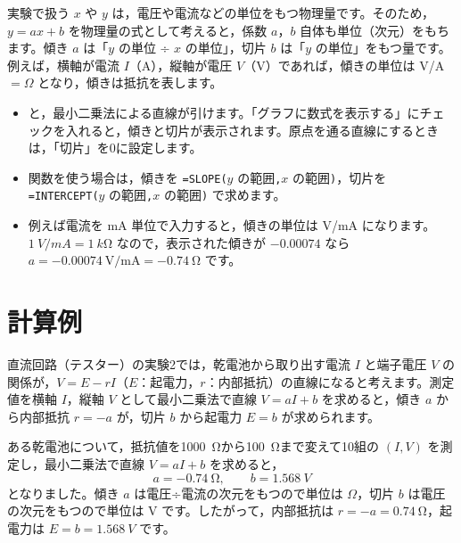 実験で扱う $x$ や $y$ は，電圧や電流などの単位をもつ物理量です。そのため，$y=ax+b$ を物理量の式として考えると，係数 $a$，$b$ 自体も単位（次元）をもちます。傾き $a$ は「$y$ の単位 ÷ $x$ の単位」，切片 $b$ は「$y$ の単位」をもつ量です。例えば，横軸が電流 $I$（A），縦軸が電圧 $V$（V）であれば，傾きの単位は V/A $=\Omega$ となり，傾きは抵抗を表します。

\begin{hosoku}
\begin{itemize}
  \item {}と，最小二乗法による直線が引けます。「グラフに数式を表示する」にチェックを入れると，傾きと切片が表示されます。原点を通る直線にするときは，「切片」を0に設定します。
  \item 関数を使う場合は，傾きを \texttt{=SLOPE(}$y$ の範囲\texttt{,}$x$ の範囲\texttt{)}，切片を \texttt{=INTERCEPT(}$y$ の範囲\texttt{,}$x$ の範囲\texttt{)} で求めます。
  \item {}例えば電流を mA 単位で入力すると，傾きの単位は V/mA になります。$\SI{1}{V/mA}=\SI{1}{k\ohm}$ なので，表示された傾きが $-0.00074$ なら $a=-0.00074\ \mathrm{V/mA}=\SI{-0.74}{\ohm}$ です。
\end{itemize}
\end{hosoku}

\section{計算例}

直流回路（テスター）の実験2では，乾電池から取り出す電流 $I$ と端子電圧 $V$ の関係が，$V=E-rI$（$E$：起電力，$r$：内部抵抗）の直線になると考えます。測定値を横軸 $I$，縦軸 $V$ として最小二乗法で直線 $V=aI+b$ を求めると，傾き $a$ から内部抵抗 $r=-a$ が，切片 $b$ から起電力 $E=b$ が求められます。

\begin{hosoku}[例：乾電池の内部抵抗と起電力]
ある乾電池について，抵抗値を\SI{1000}{\ohm}から\SI{100}{\ohm}まで変えて10組の $(I, V)$ を測定し，最小二乗法で直線 $V=aI+b$ を求めると，
\[
  a = \SI{-0.74}{\ohm},\qquad b = \SI{1.568}{V}
\]
となりました。傾き $a$ は電圧÷電流の次元をもつので単位は $\Omega$，切片 $b$ は電圧の次元をもつので単位は V です。したがって，内部抵抗は $r=-a=\SI{0.74}{\ohm}$，起電力は $E=b=\SI{1.568}{V}$ です。
\end{hosoku}

